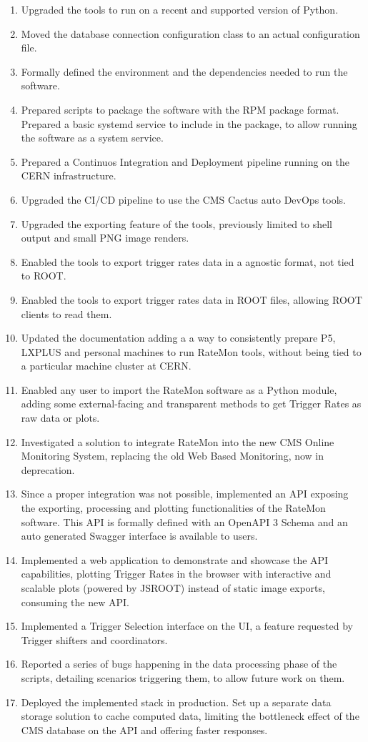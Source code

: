 \begin{enumerate}

\item Upgraded the tools to run on a recent and supported version of Python.
\item Moved the database connection configuration class to an actual configuration file.
\item Formally defined the environment and the dependencies needed to run the software.
\item Prepared scripts to package the software with the RPM package format. Prepared a basic systemd service to include in the package, to allow running the software as a system service.
\item Prepared a Continuos Integration and Deployment pipeline running on the CERN infrastructure.
\item Upgraded the CI/CD pipeline to use the CMS Cactus auto DevOps tools.
\item Upgraded the exporting feature of the tools, previously limited to shell output and small PNG image renders.
\item Enabled the tools to export trigger rates data in a agnostic format, not tied to ROOT.
\item Enabled the tools to export trigger rates data in ROOT files, allowing ROOT clients to read them.
\item Updated the documentation adding a a way to consistently prepare P5, LXPLUS and personal machines to run RateMon tools, without being tied to a particular machine cluster at CERN.
\item Enabled any user to import the RateMon software as a Python module, adding some external-facing and transparent methods to get Trigger Rates as raw data or plots.
\item Investigated a solution to integrate RateMon into the new CMS Online Monitoring System, replacing the old Web Based Monitoring, now in deprecation.
\item Since a proper integration was not possible, implemented an API exposing the exporting, processing and plotting functionalities of the RateMon software. This API is formally defined with an OpenAPI 3 Schema and an auto generated Swagger interface is available to users.
\item Implemented a web application to demonstrate and showcase the API capabilities, plotting Trigger Rates in the browser with interactive and scalable plots (powered by JSROOT) instead of static image exports, consuming the new API.
\item Implemented a Trigger Selection interface on the UI, a feature requested by Trigger shifters and coordinators.
\item Reported a series of bugs happening in the data processing phase of the scripts, detailing scenarios triggering them, to allow future work on them.
\item Deployed the implemented stack in production. Set up a separate data storage solution to cache computed data, limiting the bottleneck effect of the CMS database on the API and offering faster responses.

\end{enumerate}


